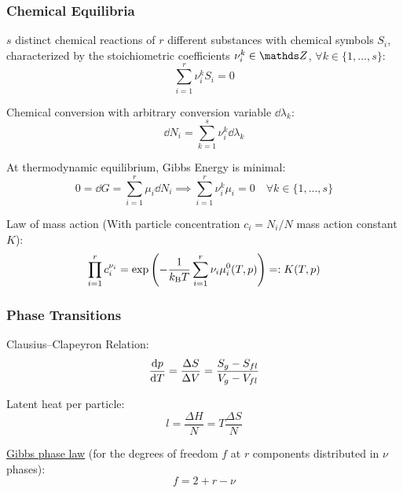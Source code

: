 		\subsubsection{Chemical Equilibria}
			\noindent
			$s$ distinct chemical reactions of $r$ different substances with chemical symbols $S_i$, characterized by the stoichiometric coefficients $\nu_i^k\in\integers$, $\forall k\in\lbrace1,...,s\rbrace$:
			\begin{equation}
				\sum_{i=1}^r \nu_i^k S_i = 0
			\end{equation}

			\noindent
			Chemical conversion with arbitrary conversion variable $\dd \lambda_k$:
			\begin{equation}
				\dd N_i = \sum_{k=1}^s \nu_i^k \dd \lambda_k
			\end{equation}

			\noindent
			At thermodynamic equilibrium, Gibbs Energy is minimal:
			\begin{equation}
				0 = \dd G = \sum_{i=1}^r \mu_i \dd N_i \implies \sum_{i=1}^r \nu_i^k \mu_i = 0 \quad\forall k\in\lbrace1,...,s\rbrace
			\end{equation}

			\noindent
			Law of mass action (With particle concentration $c_i = N_i/N$ mass action constant $K$):
			\begin{equation}
				\prod_{i=1}^r	c_i^{\nu_i} = \exp\left( -\frac{1}{k_{\text{B}} T}\sum_{i=1}^r \nu_i\mu_i^0(T,p) \right) =: K(T,p)
			\end{equation}

		\subsubsection{Phase Transitions}
			\noindent
			Clausius--Clapeyron Relation:
			\begin{equation}
				\dv{p}{T} = \frac{\Delta S}{\Delta V} = \frac{S_g - S_{fl}}{V_g - V_{fl}}
			\end{equation}

			\noindent
			Latent heat per particle:
			\begin{equation}
				l = \frac{\Delta H}{N} = T\frac{\Delta S}{N}
			\end{equation}

			\noindent
			\href{https://en.wikipedia.org/wiki/Phase_rule}{Gibbs phase law} (for the degrees of freedom $f$ at $r$ components distributed in $\nu$ phases):
			\begin{equation}
				f = 2 + r - \nu
			\end{equation}

